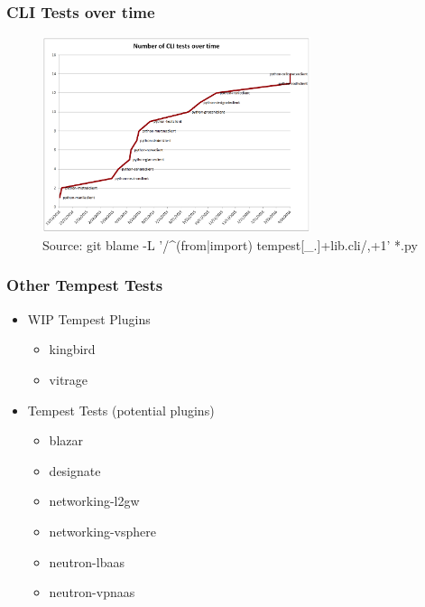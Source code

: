 \documentclass[aspectratio=169,11pt,hyperref={colorlinks=true}]{beamer}
\begin{document}
\begin{frame}
    \frametitle{CLI Tests over time}
    \begin{figure}[p]
    	\centering
    	\includegraphics[width=0.7\textwidth]{cli-tests.png}
        \caption{Source: git blame -L '/\^{}(from|import) tempest[\_.]+lib.cli/,+1' *.py}
    \end{figure}
\end{frame}

\begin{frame}
    \frametitle{Other Tempest Tests}
    \begin{itemize}
        \item{WIP Tempest Plugins}
            \begin{itemize}
                \item{kingbird}
                \item{vitrage}
            \end{itemize}
    \end{itemize}
    \begin{itemize}
        \item{Tempest Tests (potential plugins)}
            \begin{itemize}
                \item{blazar}
                \item{designate}
                \item{networking-l2gw}
                \item{networking-vsphere}
                \item{neutron-lbaas}
                \item{neutron-vpnaas}
            \end{itemize}
    \end{itemize}
\end{frame}
\end{document}
